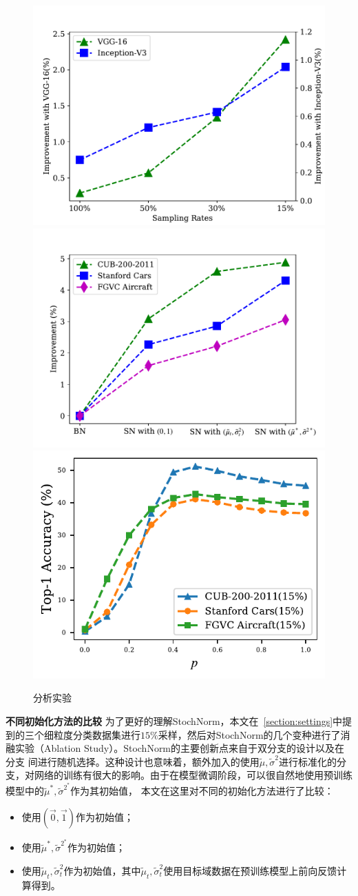 \begin{figure}
  \centering
    {\includegraphics[width=0.48\linewidth]{figures/backbone.pdf}}
    {\includegraphics[width=0.48\linewidth]{figures/method.pdf}}
    {\includegraphics[width=0.48\linewidth]{figures/p_acc.pdf}}
  \caption{分析实验}
\end{figure}

\textbf{不同初始化方法的比较 } 为了更好的理解StochNorm，本文在~\ref{section:settings}中提到的三个细粒度分类数据集进行$15\%$采样，然后对StochNorm的几个变种进行了消融实验（Ablation Study）。StochNorm的主要创新点来自于双分支的设计以及在分支
间进行随机选择。这种设计也意味着，额外加入的使用$\tilde{\mu}, \tilde{\sigma}^2$进行标准化的分支，对网络的训练有很大的影响。由于在模型微调阶段，可以很自然地使用预训练模型中的$\tilde{\mu}^*, \tilde{\sigma}^{2^*}$作为其初始值，
本文在这里对不同的初始化方法进行了比较：
\begin{itemize}
  \item 使用$(\vec{0}, \vec{1})$作为初始值；
  \item 使用$\tilde{\mu}^*, \tilde{\sigma}^{2^*}$作为初始值；
  \item 使用$\tilde{\mu}_t, \tilde{\sigma}_t^2$作为初始值，其中$\tilde{\mu}_t, \tilde{\sigma}_t^2$使用目标域数据在预训练模型上前向反馈计算得到。
\end{itemize}

